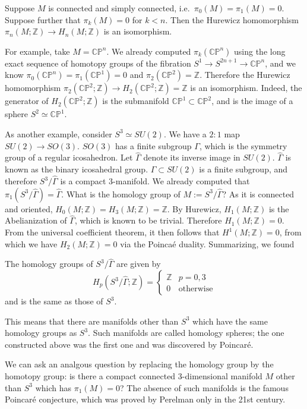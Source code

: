 \documentclass[12pt]{article}
\numberwithin{equation}{section}
\theoremstyle{remark}
\def\bZ{\mathbb{Z}}
\def\CP{\mathbb{CP}}
\begin{document}
\begin{theorem}
  Suppose $M$ is connected and simply connected,
  i.e.~$\pi_0(M)=\pi_1(M)=0$.
  Suppose further that $\pi_k(M)=0$ for $k<n$.
  Then the Hurewicz homomorphism $\pi_n(M;\bZ)\to H_n(M;\bZ)$ is an isomorphism.
\end{theorem}

For example, take $M=\CP^n$.
We already computed $\pi_k(\CP^n)$ using the long exact sequence of homotopy groups of the fibration $S^1\to S^{2n+1}\to \CP^n$,
and we know $\pi_{0}(\CP^n)=\pi_1(\CP^1)=0$ and $\pi_2(\CP^2)=\bZ$.
Therefore the Hurewicz homomorphism $\pi_2(\CP^2;\bZ)\to H_2(\CP^2;\bZ)=\bZ$ is an isomorphism.
Indeed, the generator of $H_2(\CP^2;\bZ)$ is the submanifold $\CP^1\subset \CP^2$,
and is the image of a sphere $S^2\simeq \CP^1$.


As another example, consider $S^3\simeq SU(2)$.
We have a $2:1$ map $SU(2)\to SO(3)$.
$SO(3)$ has a finite subgroup $\Gamma$, which is the symmetry group of a regular icosahedron.
Let $\hat\Gamma$ denote its inverse image in $SU(2)$.
$\hat \Gamma$ is known as the binary icosahedral group.
$\hat\Gamma\subset SU(2)$ is a finite subgroup,
and therefore $S^3/\hat\Gamma$ is a compact $3$-manifold.
We already computed that $\pi_1(S^3/\hat\Gamma)=\hat\Gamma$.
What is the homology group of $M:=S^3/\hat\Gamma$?
As it is connected and oriented, $H_0(M;\bZ)=H_3(M;\bZ)=\bZ$.
By Hurewicz, $H_1(M;\bZ)$ is the Abelianization of $\hat\Gamma$,
which is known to be trivial. 
Therefore $H_1(M;\bZ)=0$.
From the universal coefficient theorem, it then follows that $H^1(M;\bZ)=0$,
from which we have $H_2(M;\bZ)=0$ via the Poinca\'e duality.
Summarizing, we found 
\begin{example}
  The homology groups of $S^3/\hat\Gamma$ are given by \begin{equation}
    H_p(S^3/\hat\Gamma;\bZ) = \begin{cases} \bZ & p=0,3 \\ 0 & \text{otherwise} \end{cases}
  \end{equation}
  and is the same as those of $S^3$.
\end{example}
This means that there are manifolds other than $S^3$ which have the same homology groups as $S^3$.
Such manifolds are called homology spheres;
the one constructed above was the first one and was discovered by Poincar\'e.

We can ask an analgous question by replacing the homology group by the homotopy group: 
is there a compact connected 3-dimensional manifold $M$ other than $S^3$ which has $\pi_1(M)=0$?
The absence of such manifolds is the famous Poincar\'e conjecture, 
which was proved by Perelman only in the 21st century.
\end{document}
